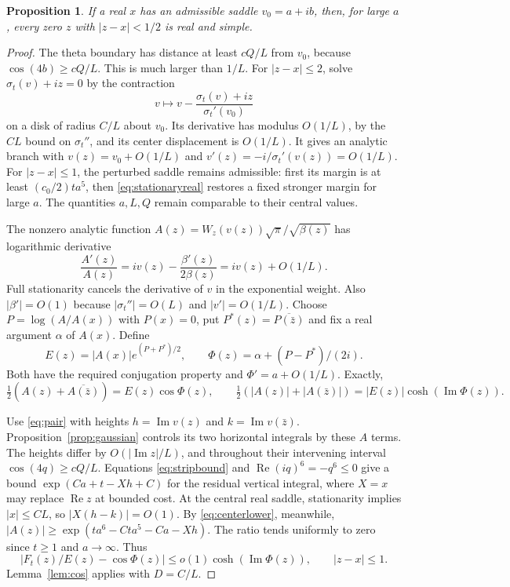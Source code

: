 \documentclass[11pt]{article}
\newtheorem{proposition}[theorem]{Proposition}
\begin{document}
\begin{proposition}\label{prop:local}
If a real $x$ has an admissible saddle $v_0=a+ib$, then,
for large $a$, every zero $z$ with $|z-x|<1/2$ is real and simple.
\end{proposition}
\begin{proof}
The theta boundary has distance at least $cQ/L$ from $v_0$,
because $\cos(4b)\geq cQ/L$. This is much larger than
$1/L$. For $|z-x|\leq2$, solve $\sigma_t(v)+iz=0$ by
the contraction
\[
 v\longmapsto v-\frac{\sigma_t(v)+iz}{\sigma_t'(v_0)}
\]
on a disk of radius $C/L$ about $v_0$. Its derivative
has modulus $O(1/L)$, by the $CL$ bound on $\sigma_t''$,
and its center displacement is $O(1/L)$. It gives an
analytic branch with
$v(z)=v_0+O(1/L)$ and $v'(z)=-i/\sigma_t'(v(z))=O(1/L)$.
For $|z-x|\leq1$, the perturbed saddle remains admissible:
first its margin is at least $(c_0/2)ta^5$, then
\eqref{eq:stationaryreal} restores a fixed stronger margin
for large $a$. The quantities $a,L,Q$ remain comparable
to their central values.

The nonzero analytic function
$A(z)=W_z(v(z))\sqrt\pi/\sqrt{\beta(z)}$
has logarithmic derivative
\begin{equation}\label{eq:logder}
 \frac{A'(z)}{A(z)}=iv(z)-\frac{\beta'(z)}{2\beta(z)}
 =iv(z)+O(1/L).
\end{equation}
Full stationarity cancels the derivative of $v$ in the
exponential weight. Also $|\beta'|=O(1)$ because
$|\sigma_t''|=O(L)$ and $|v'|=O(1/L)$.
Choose $P=\log(A/A(x))$ with $P(x)=0$, put
$P^*(z)=\overline{P(\bar z)}$ and fix a real argument
$\alpha$ of $A(x)$. Define
\[
 E(z)=|A(x)|e^{(P+P^*)/2},\qquad
 \Phi(z)=\alpha+(P-P^*)/(2i).
\]
Both have the required conjugation property and
$\Phi'=a+O(1/L)$. Exactly,
\[
 \tfrac12(A(z)+\overline{A(\bar z)})=E(z)\cos\Phi(z),\qquad
 \tfrac12(|A(z)|+|A(\bar z)|)=|E(z)|\cosh(\operatorname{Im}\Phi(z)).
\]

Use \eqref{eq:pair} with heights $h=\operatorname{Im}v(z)$
and $k=\operatorname{Im}v(\bar z)$. Proposition~\ref{prop:gaussian}
controls its two horizontal integrals by these $A$ terms.
The heights differ by $O(|\operatorname{Im}z|/L)$, and
throughout their intervening interval
$\cos(4q)\geq cQ/L$. Equations \eqref{eq:stripbound}
and $\operatorname{Re}(iq)^6=-q^6\leq0$ give a bound
$\exp(Ca+t-Xh+C)$ for the residual vertical integral,
where $X=x$ may replace $\operatorname{Re}z$ at bounded
cost. At the central real saddle, stationarity implies
$|x|\leq CL$, so $|X(h-k)|=O(1)$.
By \eqref{eq:centerlower}, meanwhile,
$|A(z)|\geq\exp(ta^6-Cta^5-Ca-Xh)$.
The ratio tends uniformly to zero since $t\geq1$ and
$a\to\infty$. Thus
\[
 |F_t(z)/E(z)-\cos\Phi(z)|
 \leq o(1)\cosh(\operatorname{Im}\Phi(z)),\qquad |z-x|\leq1.
\]
Lemma~\ref{lem:cos} applies with $D=C/L$.
\end{proof}
\end{document}
